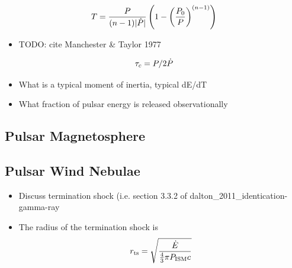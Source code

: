 \begin{equation}
  T = \frac{P}{(n-1) |\dot{P}|}
  \left(
  1-\left(\frac{P_0}{P}\right)^{(n-1)}
  \right)
\end{equation}

\begin{itemize}
  \item TODO: cite Manchester \& Taylor 1977
\end{itemize}



\begin{equation}
  \tau_c = P/2\dot{P}
\end{equation}


\begin{itemize}
  \item What is a typical moment of inertia, typical dE/dT
  \item What fraction of pulsar energy is released observationally
\end{itemize}

\subsection{Pulsar Magnetosphere}

\subsection{Pulsar Wind Nebulae}

\begin{itemize}
  \item Discuss termination shock (i.e. section 3.3.2 of dalton\_2011\_identication-gamma-ray
  \item The radius of the termination shock is
    \begin{equation}
      r_\text{ts} = \sqrt{\frac{\dot{E}}{\tfrac{4}{3}\pi P_\text{ISM} c}}
    \end{equation}

\end{itemize}



